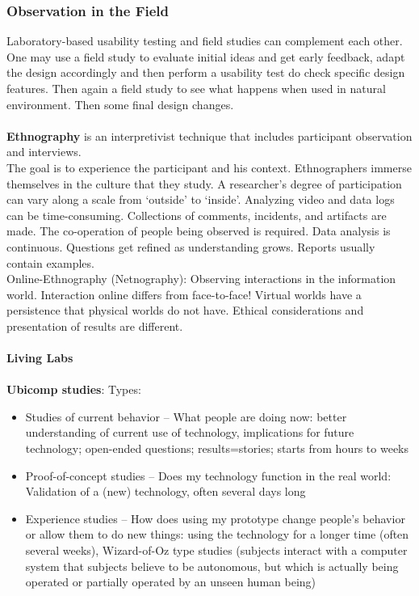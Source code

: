 \subsubsection{Observation in the Field}
Laboratory-based usability testing and field studies can complement each other. One may use a field study to evaluate initial ideas and get early feedback, adapt the design accordingly and then perform a usability test do check specific design features. Then again a field study to see what happens when used in natural environment. Then some final design changes. \\\\
\textbf{Ethnography} is an interpretivist technique that includes participant observation and interviews.\\
The goal is to experience the participant and his context. Ethnographers immerse themselves in the culture that they study. A researcher's degree of participation can vary along a scale
from `outside' to `inside'. Analyzing video and data logs can be time-consuming. Collections of comments, incidents, and artifacts are made.
The co-operation of people being observed is required. Data analysis is continuous. Questions get refined as understanding grows. Reports usually contain examples.\\
Online-Ethnography (Netnography): Observing interactions in the information world. Interaction online differs from face-to-face! Virtual worlds have a persistence that physical worlds do not have. Ethical considerations and presentation of results are different.\\\\
\textbf{Living Labs}\\\\
\textbf{Ubicomp studies}: Types:
\begin{itemize}
\item Studies of current behavior -- What people are doing now: better understanding of current use of technology, implications for future technology; open-ended questions; results=stories; starts from hours to weeks
\item Proof-of-concept studies -- Does my technology function in the real world: Validation of a (new) technology, often several days long
\item Experience studies -- How does using my prototype change people's behavior or allow them to do new things: using the technology for a longer time (often several weeks), Wizard-of-Oz type studies (subjects interact with a computer system that subjects believe to be autonomous, but which is actually being operated or partially operated by an unseen human being)
\end{itemize}

